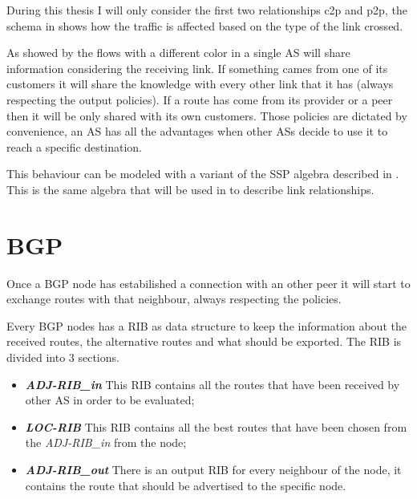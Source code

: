 During this thesis I will only consider the first two relationships \ac{c2p} and
\ac{p2p}, the schema in  shows how the traffic is affected
based on the type of the link crossed.

As showed by the flows with a different color in  a single
\ac{AS} will share information considering the receiving link.
If something cames from one of its customers it will share the knowledge with
every other link that it has (always respecting the output policies).
If a route has come from its provider or a peer then it will be only shared with 
its own customers.
Those policies are dictated by convenience, an \ac{AS} has all the advantages when
other \acp{AS} decide to use it to reach a specific destination.

This behaviour can be modeled with a variant of the \ac{SSP} algebra described
in \cite{daggitt2018rate}.
This is the same algebra that will be used in  to describe link
relationships.


\section{BGP}
\label{sec:bgp_intro}

Once a \ac{BGP} node has estabilished a connection with an other peer it will
start to exchange routes with that neighbour, always respecting the policies.

Every \ac{BGP} nodes has a \ac{RIB} as data structure to keep the information
about the received routes, the alternative routes and what should be exported.
The \ac{RIB} is divided into \num{3} sections.
\begin{itemize}
	\item \textbf{\textit{ADJ-RIB\_in}} This \ac{RIB} contains all the routes
		that have been received by other \ac{AS} in order to be evaluated;
	\item \textbf{\textit{LOC-RIB}} This \ac{RIB} contains all the best routes
		that have been chosen from the \textit{ADJ-RIB\_in} from the node;
	\item \textbf{\textit{ADJ-RIB\_out}} There is an output \ac{RIB} for every
		neighbour of the node, it contains the route that should be advertised 
		to the specific node.
\end{itemize}

